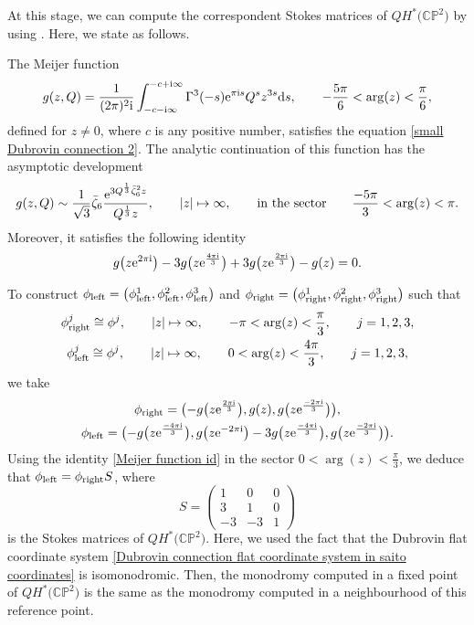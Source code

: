 At this stage, we can compute the correspondent Stokes matrices of $QH^{*}\bigl(\mathbb{CP}^2\bigr)$ by using \cite[Lemma~4.9]{B.Dubrovin3}. Here, we state as follows.

\begin{Lemma}
The Meijer function
\[%
g(z,Q)=\frac{1}{(2\pi)^2{\rm i}}\int_{-c-{\rm i}\infty}^{-c+{\rm i}\infty} \Gamma^3(-s){\rm e}^{\pi {\rm i}s }Q^sz^{3s}{\rm d}s, \qquad -\frac{5\pi}{6}<\arg(z)<\frac{\pi}{6},
\]
defined for $z\neq 0$, where $c$ is any positive number, satisfies the equation \eqref{small Dubrovin connection 2}. The analytic continuation of this function has the asymptotic development
\[
g(z,Q)\sim \frac{1}{\sqrt{3}}\bar\zeta_6\frac{{\rm e}^{3Q^{\frac{1}{3}}\bar\zeta_6^2z}}{Q^{\frac{1}{3}}z}, \qquad |z|\mapsto \infty, \qquad \text{in the sector} \qquad \frac{-5\pi}{3}<\arg(z)<\pi.
\]
Moreover, it satisfies the following identity
\begin{gather}\label{Meijer function id}
g\bigl(z{\rm e}^{2\pi {\rm i}}\bigr)-3g\bigl(z{\rm e}^{\frac{4\pi {\rm i}}{3}}\bigr)+3g\bigl(z{\rm e}^{\frac{2\pi {\rm i}}{3}}\bigr)-g(z)=0.
\end{gather}

\end{Lemma}


To construct $\phi_{\rm left}=\bigl(\phi_{\rm left}^1,\phi_{\rm left}^2,\phi_{\rm left}^3\bigr)$ and $\phi_{\rm right}=\bigl(\phi_{\rm right}^1,\phi_{\rm right}^2,\phi_{\rm right}^3\bigr)$ such that
\begin{gather*}
\phi_{\rm right}^j\cong\phi^j, \qquad |z|\mapsto \infty, \qquad -\pi<\arg(z)<\frac{\pi}{3}, \qquad j=1,2,3,\\
\phi_{\rm left}^j\cong\phi^j, \qquad |z|\mapsto \infty, \qquad 0<\arg(z)<\frac{4\pi}{3}, \qquad j=1,2,3,
\end{gather*}
we take
\begin{gather*}
\phi_{\rm right}=\bigl(-g\bigl(z{\rm e}^{\frac{2\pi {\rm i}}{3}}\bigr),g(z),g\bigl(z{\rm e}^{\frac{-2\pi {\rm i}}{3}}\bigr) \bigr),\\
\phi_{\rm left}=\bigl(-g\bigl(z{\rm e}^{\frac{-4\pi {\rm i}}{3}}\bigr),g\bigl(z{\rm e}^{-2\pi {\rm i}}\bigr)-3g\bigl(z{\rm e}^{\frac{-4\pi {\rm i}}{3}}\bigr),g\bigl(z{\rm e}^{\frac{-2\pi {\rm i}}{3}}\bigr) \bigr).
\end{gather*}
Using the identity \eqref{Meijer function id} in the sector $0<\arg(z)<\frac{\pi}{3}$, we deduce that
$\phi_{\rm left}=\phi_{\rm right}S$,
where
\[
S={\begin{pmatrix}
1& 0&0 \\
3& 1& 0\\
-3& -3 & 1
\end{pmatrix}}
\]
is the Stokes matrices of $QH^{*}\bigl(\mathbb{CP}^2\bigr)$. Here, we used the fact that the Dubrovin flat coordinate system \eqref{Dubrovin connection flat coordinate system in saito coordinates} is isomonodromic. Then, the monodromy computed in a fixed point of $QH^{*}\bigl(\mathbb{CP}^2\bigr)$ is the same as the monodromy computed in a neighbourhood of this reference point.

